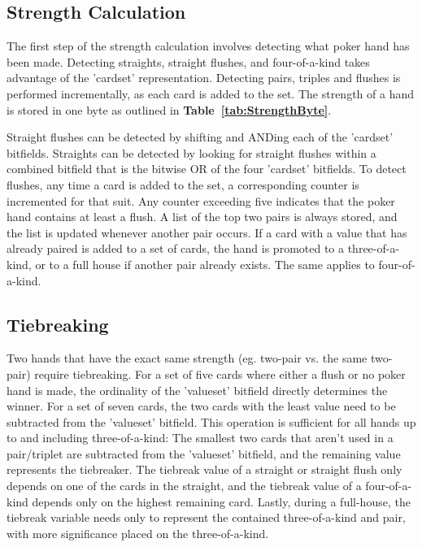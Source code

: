\subsection{Strength Calculation}
\label{sec:StrengthCalculation}

The first step of the strength calculation involves detecting what poker hand has been made.
Detecting straights, straight flushes, and four-of-a-kind takes advantage of the 'cardset' representation.
Detecting pairs, triples and flushes is performed incrementally, as each card is added to the set.
The strength of a hand is stored in one byte as outlined in \textbf{Table~\ref{tab:StrengthByte}}.

Straight flushes can be detected by shifting and ANDing each of the 'cardset' bitfields.
Straights can be detected by looking for straight flushes within a combined bitfield that is the bitwise OR of the four 'cardset' bitfields.
To detect flushes, any time a card is added to the set, a corresponding counter is incremented for that suit.
Any counter exceeding five indicates that the poker hand contains at least a flush.
A list of the top two pairs is always stored, and the list is updated whenever another pair occurs.
If a card with a value that has already paired is added to a set of cards, the hand is promoted to a three-of-a-kind, or to a full house if another pair already exists.
The same applies to four-of-a-kind.


\subsection{Tiebreaking}
\label{sec:Tiebreaking}
Two hands that have the exact same strength (eg. two-pair vs. the same two-pair) require tiebreaking.
For a set of five cards where either a flush or no poker hand is made, the ordinality of the 'valueset' bitfield directly determines the winner.
For a set of seven cards, the two cards with the least value need to be subtracted from the 'valueset' bitfield.
This operation is sufficient for all hands up to and including three-of-a-kind: The smallest two cards that aren't used in a pair/triplet are subtracted from the 'valueset' bitfield, and the remaining value represents the tiebreaker.
The tiebreak value of a straight or straight flush only depends on one of the cards in the straight, and the tiebreak value of a four-of-a-kind depends only on the highest remaining card.
Lastly, during a full-house, the tiebreak variable needs only to represent the contained three-of-a-kind and pair, with more significance placed on the three-of-a-kind.

